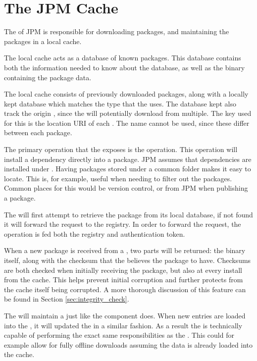 \section{The JPM Cache}
\label{sec:cache}

The \cache of JPM is responsible for downloading packages, and maintaining the
packages in a local cache.

The local cache acts as a database of known packages. This database contains
both the information needed to know about the database, as well as the binary
containing the package data.

The local cache consists of previously downloaded packages, along with a
locally kept database which matches the type that the \registry uses. The
database kept also track the origin \registry, since the \cache will
potentially download from multiple. The key used for this is the location URI
of each \registry. The name cannot be used, since these differ between each
package.

The primary operation that the \cache exposes is the 
operation. This operation will install a dependency directly into a package.
JPM assumes that dependencies are installed under
. Having packages stored under a common
folder makes it easy to locate. This is, for example, useful when needing to
filter out the packages. Common places for this would be version control, or
from JPM when publishing a package.

The \cache will first attempt to retrieve the package from its local database,
if not found it will forward the request to the registry. In order to
forward the request, the operation is fed both the registry and
authentication token.

When a new package is received from a \registry, two parts will be returned:
the binary itself, along with the checksum that the \registry believes the
package to have. Checksums are both checked when initially receiving the
package, but also at every install from the cache. This helps prevent initial
corruption and further protects from the cache itself being corrupted. A more
thorough discussion of this feature can be found in Section
\ref{sec:integrity_check}.

The \cache will maintain a \regdb just like the \registry component does. When
new entries are loaded into the \cache, it will updated the \regdb in a similar
fashion. As a result the \cache is technically capable of performing the exact
same responsibilities as the \registry. This could for example allow for fully
offline downloads assuming the data is already loaded into the cache.

